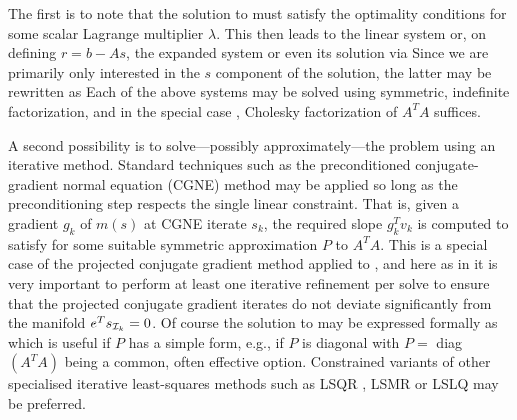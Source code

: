 \documentclass[12pt,twoside]{article}
\begin{document}
The first is to note that the solution
to  must satisfy the optimality conditions
for some scalar Lagrange multiplier $\lambda$. This then leads to the
linear system
or, on defining $r = b - A s$, the expanded system
or even its solution via
Since we are primarily only interested in the $s$ component of the
solution, the latter may be rewritten as
Each of the above systems may be solved using symmetric, indefinite
factorization, and in the special case , Cholesky factorization
of $A^T A$ suffices.

A second possibility is to solve---possibly approximately---the problem
using an iterative method. Standard techniques such as the preconditioned
conjugate-gradient normal equation (CGNE) method may be applied so long
as the preconditioning step respects the single linear constraint. That is,
given a gradient $g_k$ of $m(s)$ at CGNE iterate $s_k$, the required slope
$g_k^T v_k$ is computed to satisfy
for some suitable symmetric approximation $P$ to $A^T A$. 
This is a special case of the projected conjugate gradient method
\cite{GoulHribNoce01:sisc} applied to , and here as
in \cite[\S5]{GoulHribNoce01:sisc} it is very important to perform at
least one iterative refinement per solve  to ensure that the projected
conjugate gradient iterates do not deviate significantly from the 
manifold $e^T s_{{\cal I}_k} = 0$. Of course the solution to  may be
expressed formally as
which is useful if $P$ has a simple form, e.g., if $P$ is diagonal with
$P = $ diag$(A^T A)$ being a common, often effective \cite{GoulScot17:toms}
option. Constrained variants of other specialised iterative least-squares 
methods such as LSQR \cite{PaigSaun82a:toms},
LSMR \cite{FongSaun11:sisc} or LSLQ \cite{EstrOrbaSaun19:simaa}
may be preferred. 
\end{document}
